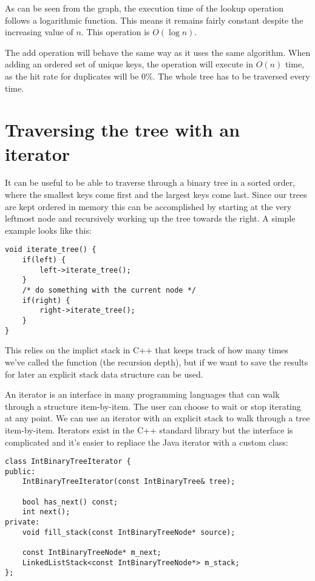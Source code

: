 \documentclass[a4paper,11pt]{article}
\begin{document}
\begin{table}[H]
\centering
{}
\end{table}

As can be seen from the graph, the execution time of the lookup operation follows a logarithmic function. This means it remains fairly constant despite the increasing value of $n$. This operation is $O(\log n)$.

The add operation will behave the same way as it uses the same algorithm. When adding an ordered set of unique keys, the operation will execute in $O(n)$ time, as the hit rate for duplicates will be 0\%. The whole tree has to be traversed every time.

\section*{Traversing the tree with an iterator}

It can be useful to be able to traverse through a binary tree in a sorted order, where the smallest keys come first and the largest keys come last.
Since our trees are kept ordered in memory this can be accomplished by starting at the very leftmost node and recursively working up the tree towards the right. A simple example looks like this:
\begin{verbatim}
void iterate_tree() {
	if(left) {
		left->iterate_tree();
	}
	/* do something with the current node */
	if(right) {
		right->iterate_tree();
	}
}
\end{verbatim}

This relies on the implict stack in C++ that keeps track of how many times we've called the function (the recursion depth), but if we want to save the results for later an explicit stack data structure can be used.

An iterator is an interface in many programming languages that can walk through a structure item-by-item. The user can choose to wait or stop iterating at any point.
We can use an iterator with an explicit stack to walk through a tree item-by-item. Iterators exist in the C++ standard library but the interface is complicated and it's easier to repliace the Java iterator with a custom class:
\begin{verbatim}
class IntBinaryTreeIterator {
public:
	IntBinaryTreeIterator(const IntBinaryTree& tree);

	bool has_next() const;
	int next();
private:
	void fill_stack(const IntBinaryTreeNode* source);

	const IntBinaryTreeNode* m_next;
	LinkedListStack<const IntBinaryTreeNode*> m_stack;
};
\end{verbatim}
\end{document}
